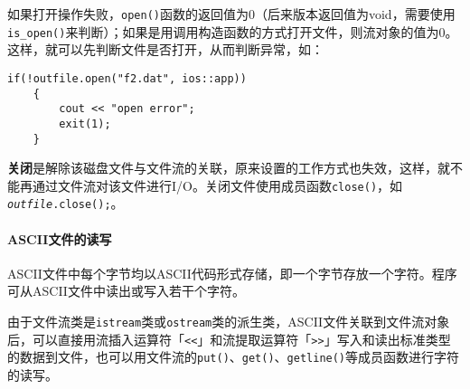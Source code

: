 \documentclass[10pt, a4paper, oneside, fontset=none]{ctexart}
\theoremstyle{plain}
\theoremstyle{definition}
\newcommand{\colors}[1]{\color{#1!75!black}}
\newcommand{\tboba}[1]{\textbf{\kai\color{bali!75!black}#1}}
\begin{document}
如果打开操作失败，\texttt{open()}函数的返回值为0（后来版本返回值为void，需要使用\texttt{is\_open()}来判断）；如果是用调用构造函数的方式打开文件，则流对象的值为0。这样，就可以先判断文件是否打开，从而判断异常，如：
\begin{lstlisting}[moreemph={ofstream}, emphstyle=\colors{qinglv}, 
	moreemph={[2]{outfile}}, emphstyle={[2]\it\ttfamily},]
	if(!outfile.open("f2.dat", ios::app))
	{
		cout << "open error";
		exit(1);
	}
\end{lstlisting}

\tboba{关闭}是解除该磁盘文件与文件流的关联，原来设置的工作方式也失效，这样，就不能再通过文件流对该文件进行I/O。关闭文件使用成员函数\texttt{close()}，如\texttt{\textit{outfile}.close();}。

\paragraph{ASCII文件的读写}
ASCII文件中每个字节均以ASCII代码形式存储，即一个字节存放一个字符。程序可从ASCII文件中读出或写入若干个字符。

由于文件流类是\texttt{istream}类或\texttt{ostream}类的派生类，ASCII文件关联到文件流对象后，可以直接用流插入运算符「\texttt{<<}」和流提取运算符「\texttt{>>}」写入和读出标准类型的数据到文件，也可以用文件流的\texttt{put()}、\texttt{get()}、\texttt{getline()}等成员函数进行字符的读写。
\end{document}
